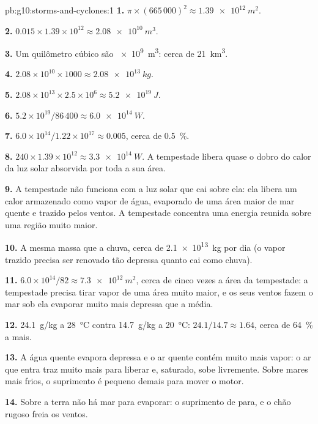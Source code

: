 \begin{solution}{pb:g10:storms-and-cyclones:1}
\textbf{1.} $\pi \times (665\,000)^2 \approx \qty{1.39e12}{m^2}$.

\textbf{2.} $0.015 \times 1.39\times10^{12} \approx \qty{2.08e10}{m^3}$.

\textbf{3.} Um quilômetro cúbico são \qty{e9}{m^3}: cerca de \qty{21}{km^3}.

\textbf{4.} $2.08\times10^{10} \times 1000 \approx \qty{2.08e13}{kg}$.

\textbf{5.} $2.08\times10^{13} \times 2.5\times10^6 \approx \qty{5.2e19}{J}$.

\textbf{6.} $5.2\times10^{19}/86\,400 \approx \qty{6.0e14}{W}$.

\textbf{7.} $6.0\times10^{14}/1.22\times10^{17} \approx 0.005$, cerca de
\qty{0.5}{\percent}.

\textbf{8.} $240 \times 1.39\times10^{12} \approx \qty{3.3e14}{W}$. A
tempestade libera quase o dobro do calor da luz solar absorvida por toda a
sua área.

\textbf{9.} A tempestade não funciona com a luz solar que cai sobre ela: ela
libera um calor armazenado como vapor de água, evaporado de uma área maior
de mar quente e trazido pelos ventos. A tempestade concentra uma energia
reunida sobre uma região muito maior.

\textbf{10.} A mesma massa que a chuva, cerca de \qty{2.1e13}{kg} por dia (o
vapor trazido precisa ser renovado tão depressa quanto cai como chuva).

\textbf{11.} $6.0\times10^{14}/82 \approx \qty{7.3e12}{m^2}$, cerca de cinco
vezes a área da tempestade: a tempestade precisa tirar vapor de uma área
muito maior, e os seus ventos fazem o mar sob ela evaporar muito mais
depressa que a média.

\textbf{12.} \qty{24.1}{g/kg} a \qty{28}{\degreeCelsius} contra
\qty{14.7}{g/kg} a \qty{20}{\degreeCelsius}: $24.1/14.7 \approx 1.64$, cerca
de \qty{64}{\percent} a mais.

\textbf{13.} A água quente evapora depressa e o ar quente contém muito mais
vapor: o ar que entra traz muito mais  para liberar e,
saturado, sobe livremente. Sobre mares mais frios, o suprimento é pequeno
demais para mover o motor.

\textbf{14.} Sobre a terra não há mar para evaporar: o suprimento de  para, e o chão rugoso freia os ventos.


\end{solution}
